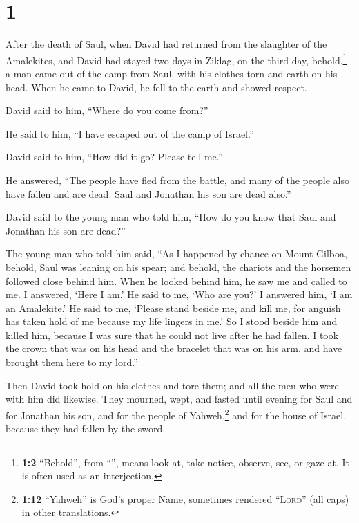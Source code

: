 \hypertarget{section}{%
\section{1}\label{section}}

 After the death of Saul, when David had returned from the
slaughter of the Amalekites, and David had stayed two days in Ziklag,
 on the third day, behold,\footnote{\textbf{1:2}
  ``Behold'', from ``'', means look at, take notice,
  observe, see, or gaze at. It is often used as an interjection.} a man
came out of the camp from Saul, with his clothes torn and earth on his
head. When he came to David, he fell to the earth and showed respect.

 David said to him, ``Where do you come from?''

He said to him, ``I have escaped out of the camp of Israel.''

 David said to him, ``How did it go? Please tell me.''

He answered, ``The people have fled from the battle, and many of the
people also have fallen and are dead. Saul and Jonathan his son are dead
also.''

 David said to the young man who told him, ``How do you
know that Saul and Jonathan his son are dead?''

 The young man who told him said, ``As I happened by
chance on Mount Gilboa, behold, Saul was leaning on his spear; and
behold, the chariots and the horsemen followed close behind him.
 When he looked behind him, he saw me and called to me. I
answered, `Here I am.'  He said to me, `Who are you?' I
answered him, `I am an Amalekite.'  He said to me, `Please
stand beside me, and kill me, for anguish has taken hold of me because
my life lingers in me.'  So I stood beside him and killed
him, because I was sure that he could not live after he had fallen. I
took the crown that was on his head and the bracelet that was on his
arm, and have brought them here to my lord.''

 Then David took hold on his clothes and tore them; and
all the men who were with him did likewise.  They
mourned, wept, and fasted until evening for Saul and for Jonathan his
son, and for the people of Yahweh,\footnote{\textbf{1:12} ``Yahweh'' is
  God's proper Name, sometimes rendered ``\textsc{Lord}'' (all caps) in
  other translations.} and for the house of Israel, because they had
fallen by the sword.

